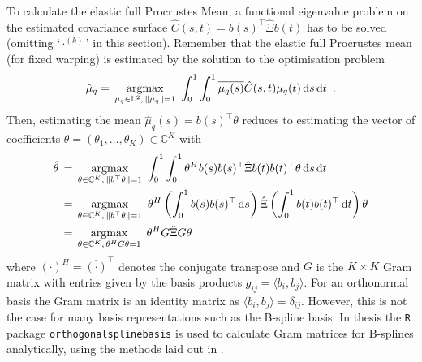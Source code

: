 To calculate the elastic full Procrustes Mean, a functional eigenvalue problem on the estimated covariance surface $\hat{C}(s,t) = b(s)^\top \hat\Xi b(t)$ has to be solved (omitting \enquote*{$\cdot^{(k)}$} in this section).
Remember that the elastic full Procrustes mean (for fixed warping) is estimated by the solution to the optimisation problem
\begin{equation}
\hat\mu_q = \, \operatorname*{argmax}_{\mu_q \in \mathbb{L}^2,\,\lVert\mu_q\rVert = 1}\,\,
   \int_0^1 \int_0^1 \overline{\mu_q (s)} \hat C(s,t) \mu_q(t) \mathop{\mathrm{d}s}\mathop{\mathrm{d}t}\,\,.
\end{equation}
Then, estimating the mean $\hat \mu_q (s) = b(s)^\top \theta$ reduces to estimating the vector of coefficients $\theta = (\theta_1, \dots, \theta_K) \in \mathbb{C}^K$ with
\begin{align}
  \hat\theta& \, = \, \operatorname*{argmax}_{\theta \in \mathbb{C}^K,\,\lVert b^\top\theta\rVert = 1}\,\,
    \int_0^1 \int_0^1 \theta^H b(s) b(s)^\top \hat\Xi b(t) b(t)^\top \theta \mathop{\mathrm{d}s}\mathop{\mathrm{d}t} \\
  &\, = \, \operatorname*{argmax}_{\theta \in \mathbb{C}^K,\,\lVert b^\top\theta\rVert = 1}\,\,
    \theta^H \left( \int_0^1 b(s) b(s)^\top \mathop{\mathrm{d}s} \right) \hat\Xi \left( \int_0^1 b(t) b(t)^\top \mathop{\mathrm{d}t}\right) \theta \\
  &\, = \, \operatorname*{argmax}_{\theta \in \mathbb{C}^K,\,\theta^H G \theta = 1}\,\,
    \theta^H G \hat\Xi G \theta \label{eq:3-target}
\end{align}
where $(\cdot)^H = \overline{(\cdot)}^\top$ denotes the conjugate transpose and $G$ is the $K \times K$ Gram matrix with entries given by the basis products $g_{ij} = \langle b_i, b_j \rangle$.
For an orthonormal basis the Gram matrix is an identity matrix as $\langle b_i, b_j \rangle = \delta_{ij}$.
However, this is not the case for many basis representations such as the B-spline basis.
In thesis the \texttt{R} package \texttt{orthogonalsplinebasis} \parencite{orthogonalsplinebasis} is used to calculate Gram matrices for B-splines analytically, using the methods laid out in \cite{Redd2012}.

